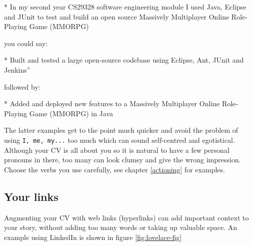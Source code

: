 \documentclass[
]{book}
\newenvironment{Shaded}{\begin{snugshade}}{\end{snugshade}}
\newcommand{\NormalTok}[1]{#1}
\newcommand{\SpecialStringTok}[1]{\textcolor[rgb]{0.31,0.60,0.02}{#1}}
\begin{document}
\begin{Shaded}
\begin{Highlighting}[]
\SpecialStringTok{* }\NormalTok{In my second year CS29328 software engineering module I used Java, Eclipse and JUnit to test and build an open source Massively Multiplayer Online Role{-}Playing Game (MMORPG)}
\end{Highlighting}
\end{Shaded}

you could say:

\begin{Shaded}
\begin{Highlighting}[]
\SpecialStringTok{* }\NormalTok{Built and tested a large open{-}source codebase using Eclipse, Ant, JUnit and Jenkins”}
\end{Highlighting}
\end{Shaded}

followed by:

\begin{Shaded}
\begin{Highlighting}[]
\SpecialStringTok{* }\NormalTok{Added and deployed new features to a Massively Multiplayer Online Role{-}Playing Game (MMORPG) in Java}
\end{Highlighting}
\end{Shaded}

The latter examples get to the point much quicker and avoid the problem of using \texttt{I,\ me,\ my...} too much which can sound self-centred and egotistical. Although your CV is all about you so it is natural to have a few personal pronouns in there, too many can look clumsy and give the wrong impression. Choose the verbs you use carefully, see chapter \ref{actioning} for examples.

\hypertarget{links}{%
\subsection{Your links}\label{links}}

Augmenting your CV with web links (hyperlinks) can add important context to your story, without adding too many words or taking up valuable space. An example using LinkedIn is shown in figure \ref{fig:lovelace-fig}
\end{document}
